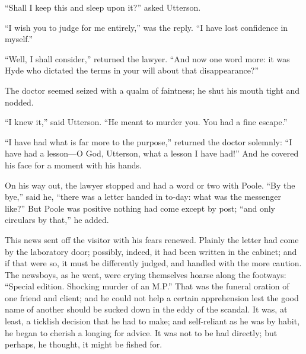 \documentclass[12pt,openright]{book}
\begin{document}
“Shall I keep this and sleep upon it?” asked Utterson.

“I wish you to judge for me entirely,” was the reply. “I have lost confidence in myself.”

“Well, I shall consider,” returned the lawyer. “And now one word more: it was Hyde who dictated the terms in your will about that disappearance?”

The doctor seemed seized with a qualm of faintness; he shut his mouth tight and nodded.

“I knew it,” said Utterson. “He meant to murder you. You had a fine escape.”

“I have had what is far more to the purpose,” returned the doctor solemnly: “I have had a lesson—O God, Utterson, what a lesson I have had!” And he covered his face for a moment with his hands.

On his way out, the lawyer stopped and had a word or two with Poole. “By the bye,” said he, “there was a letter handed in to-day: what was the messenger like?” But Poole was positive nothing had come except by post; “and only circulars by that,” he added.

This news sent off the visitor with his fears renewed. Plainly the letter had come by the laboratory door; possibly, indeed, it had been written in the cabinet; and if that were so, it must be differently judged, and handled with the more caution. The newsboys, as he went, were crying themselves hoarse along the footways: “Special edition. Shocking murder of an M.P.” That was the funeral oration of one friend and client; and he could not help a certain apprehension lest the good name of another should be sucked down in the eddy of the scandal. It was, at least, a ticklish decision that he had to make; and self-reliant as he was by habit, he began to cherish a longing for advice. It was not to be had directly; but perhaps, he thought, it might be fished for.
\end{document}
